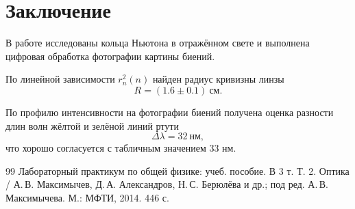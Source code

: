 \documentclass[twoside]{mfitjournal}
\begin{document}
\section*{Заключение}

В работе исследованы кольца Ньютона в отражённом свете и выполнена цифровая обработка фотографии картины биений.

По линейной зависимости $r_n^2(n)$ найден радиус кривизны линзы
\[
R = (1.6 \pm 0.1)\ \text{см}.
\]

По профилю интенсивности на фотографии биений получена оценка разности длин волн жёлтой и зелёной линий ртути
\[
\Delta \lambda = 32\ \text{нм},
\]
что хорошо согласуется с табличным значением $33$ нм.

\begin{thebibliography}{99}
Лабораторный практикум по общей физике: учеб. пособие. В 3 т. Т. 2. Оптика / А.\,В. Максимычев, Д.\,А. Александров, Н.\,С. Берюлёва и др.; под ред. А.\,В. Максимычева. М.: МФТИ, 2014. 446 с.
\end{thebibliography}
\end{document}
